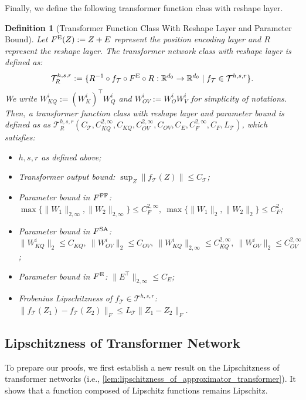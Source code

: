 \documentclass[12pt]{article}
\numberwithin{equation}{section}
\def\R{\mathbb{R}}
\theoremstyle{theoremstyle}
\newtheorem{definition}{Definition}[section]
\numberwithin{equation}{section}
\numberwithin{theorem}{section}
\numberwithin{proposition}{section}
\numberwithin{definition}{section}
\numberwithin{lemma}{section}
\numberwithin{assumption}{section}
\numberwithin{remark}{section}
\begin{document}
Finally, we define the following transformer function class with reshape layer.
\begin{definition}[Transformer Function Class With Reshape Layer and Parameter Bound]\label{def:definition_of_parameter_bound}
Let $F^{\rm E}(Z):=Z+E$ represent the position encoding layer and $R$ represent the reshape layer.
The transformer network class with reshape layer is defined as:
\begin{align*}
    \mathcal{T}^{h,s,r}_R:=\{R^{-1}\circ f_\mathcal{T}\circ F^{\rm E} \circ R:\R^{d_0}\to \R^{d_0} \mid f_\mathcal{T}\in\mathcal{T}^{h,s,r}\}.
\end{align*}
We write $W_{KQ}^i:=(W_K^i)^\top W_Q^i$ and $W_{OV}^i:=W_O^iW_V^i$ for simplicity of notations.
Then, a transformer function class with reshape layer and parameter bound is defined as as $\mathcal{T}^{h,s,r}_R(C_\mathcal{T},C^{2,\infty}_{KQ},C_{KQ},C^{2,\infty}_{OV},C_{OV},C_{E},C^{2,\infty}_{F},C_{F},L_\mathcal{T})$, which satisfies:
\begin{itemize}
    \item $h,s,r$ as defined above; 
    \item Transformer output bound: $\sup_Z \|f_\mathcal{T}(Z)\|\leq C_\mathcal{T}$;
    \item Parameter bound in $F^{\rm FF}$: $\max\{\|W_1\|_{2,\infty},\|W_2\|_{2,\infty}\}\leq C^{2,\infty}_{F},~\max\{\|W_1\|_{2},\|W_2\|_{2}\}\leq C^{2}_{F}$;
    \item Parameter bound in $F^{\rm SA}$: $\|W_{KQ}^i\|_2\leq C_{KQ},~\|W_{OV}^i\|_2\leq C_{OV},~\|W_{KQ}^i\|_{2,\infty}\leq C^{2,\infty}_{KQ},~\|W_{OV}^i\|_2\leq C^{2,\infty}_{OV}$;
    \item Parameter bound in $F^{\rm E}$: $\|E^\top\|_{2,\infty}\leq C_E$;
    \item Frobenius Lipschitzness of $f_{\mathcal{T}}\in\mathcal{T}^{h,s,r}$:$\|f_{\mathcal{T}}(Z_1)-f_{\mathcal{T}}(Z_2)\|_F\leq L_\mathcal{T}\|Z_1-Z_2\|_F$.
\end{itemize}
\end{definition}


\subsection{Lipschitzness of Transformer Network}
\label{sec:lipschitz_transformers}

To prepare our proofs, we first establish a new result on the Lipschitzness of transformer networks (i.e., \cref{lem:lipschitzness_of_approximator_transformer}). 
It shows that a function composed of Lipschitz functions remains Lipschitz.
\end{document}
